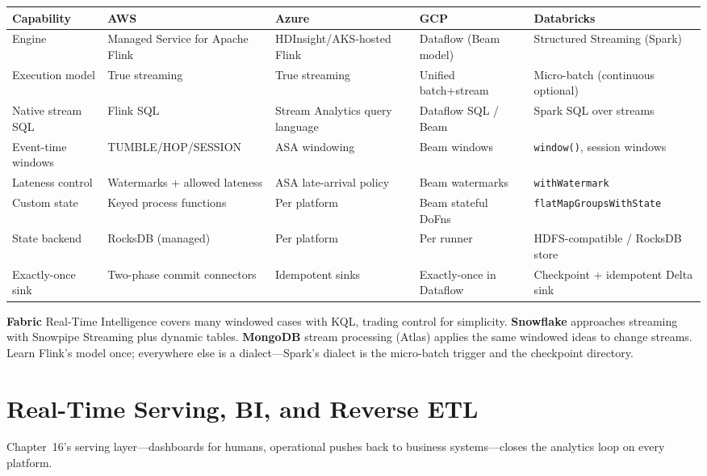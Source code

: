 \begin{center}
\footnotesize
\begin{tabular}{@{}p{2.4cm}p{2.9cm}p{2.9cm}p{2.9cm}p{2.9cm}@{}}
\toprule
\textbf{Capability} & \textbf{AWS} & \textbf{Azure} & \textbf{GCP} & \textbf{Databricks} \\
\midrule
Engine & Managed Service for Apache Flink & HDInsight/AKS-hosted Flink & Dataflow (Beam model) & Structured Streaming (Spark) \\
Execution model & True streaming & True streaming & Unified batch+stream & Micro-batch (continuous optional) \\
Native stream SQL & Flink SQL & Stream Analytics query language & Dataflow SQL / Beam & Spark SQL over streams \\
Event-time windows & TUMBLE/HOP/SESSION & ASA windowing & Beam windows & \texttt{window()}, session windows \\
Lateness control & Watermarks + allowed lateness & ASA late-arrival policy & Beam watermarks & \texttt{withWatermark} \\
Custom state & Keyed process functions & Per platform & Beam stateful DoFns & \texttt{flatMapGroupsWithState} \\
\addlinespace
State backend & RocksDB (managed) & Per platform & Per runner & HDFS-compatible / RocksDB store \\
Exactly-once sink & Two-phase commit connectors & Idempotent sinks & Exactly-once in Dataflow & Checkpoint + idempotent Delta sink \\
\bottomrule
\end{tabular}
\end{center}

\noindent \textbf{Fabric} Real-Time Intelligence covers many windowed cases with KQL, trading
control for simplicity. \textbf{Snowflake} approaches streaming with Snowpipe Streaming plus
dynamic tables. \textbf{MongoDB} stream processing (Atlas) applies the same windowed ideas to
change streams. Learn Flink's model once; everywhere else is a dialect---Spark's dialect is the
micro-batch trigger and the checkpoint directory.

\section{Real-Time Serving, BI, and Reverse ETL}
%
Chapter~16's serving layer---dashboards for humans, operational pushes back to business
systems---closes the analytics loop on every platform.

